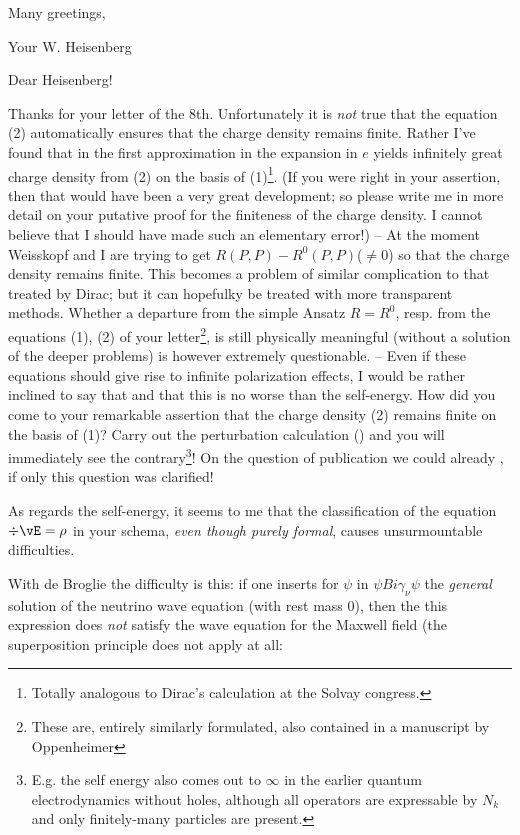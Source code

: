 \documentclass{article}
\begin{document}
Many greetings,

Your W. Heisenberg

\date{February 10, 1934}

Dear Heisenberg!

Thanks for your letter of the 8th. Unfortunately it is \textit{not} true that the equation (2) automatically ensures that the charge density remains finite. Rather I've found that in the first approximation in the expansion in $e$ yields infinitely great charge density from (2) on the basis of (1)\footnote{Totally analogous to Dirac's calculation at the Solvay congress.}. (If you were right in your assertion, then that would have been a very great development; so please write me in more detail on your putative proof for the finiteness of the charge density. I cannot believe that I should have made such an elementary error!) -- At the moment Weisskopf and I are trying to get $R(P,P)-R^0(P,P)$($\neq 0$) so that the charge density remains finite. This becomes a problem of similar complication to that treated by Dirac; but it can hopefulky be treated with more transparent methods. Whether a departure from the simple Ansatz $R=R^0$, resp. from the equations (1), (2) of your letter\footnote{These are, entirely similarly formulated, also contained in a manuscript by Oppenheimer}, is still physically meaningful (without a solution of the deeper problems) is however extremely questionable. -- Even if these equations should give rise to infinite polarization effects, I would be rather inclined to say that  and that this is no worse than the self-energy.
How did you come to your remarkable assertion that the charge density (2) remains finite on the basis of (1)? Carry out the perturbation calculation () and you will immediately see the contrary\footnote{E.g. the self energy also comes out to $\infty$ in the earlier quantum electrodynamics without holes, although all operators are expressable by $N_k$ and only finitely-many particles are present.}! On the question of publication we could already , if only this question was clarified!

As regards the self-energy, it seems to me that the classification of the equation $\div\vE = \rho$ in your schema, \textit{even though purely formal}, causes unsurmountable difficulties.

With de Broglie the difficulty is this: if one inserts for $\psi$ in $\psi B i \gamma_\nu \psi$ the \textit{general} solution of the neutrino wave equation (with rest mass $0$), then the this expression does \textit{not} satisfy the wave equation for the Maxwell field (the superposition principle does not apply at all:
\end{document}
